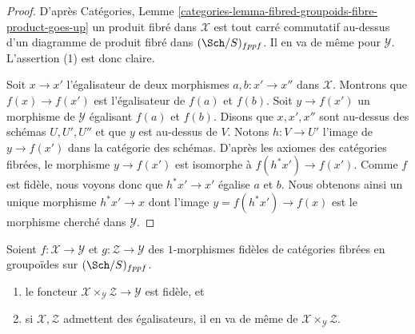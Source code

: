 \begin{proof}
D'après
Catégories, Lemme \ref{categories-lemma-fibred-groupoids-fibre-product-goes-up}
un produit fibré dans $\mathcal{X}$ est tout carré commutatif au-dessus
d'un diagramme de produit fibré dans $(\Sch/S)_{fppf}$. Il en va de même pour
$\mathcal{Y}$. L'assertion (1) est donc claire.

\medskip\noindent
Soit $x \to x'$ l'égalisateur de deux morphismes $a, b : x' \to x''$
dans $\mathcal{X}$. Montrons que $f(x) \to f(x')$ est l'égalisateur
de $f(a)$ et $f(b)$. Soit $y \to f(x')$ un morphisme de $\mathcal{Y}$
égalisant $f(a)$ et $f(b)$. Disons que $x, x', x''$ sont au-dessus des schémas
$U, U', U''$ et que $y$ est au-dessus de $V$. Notons $h : V \to U'$ l'image
de $y \to f(x')$ dans la catégorie des schémas. D'après les axiomes des catégories
fibrées, le morphisme $y \to f(x')$ est isomorphe à $f(h^*x') \to f(x')$.
Comme $f$ est fidèle, nous voyons donc que
$h^*x' \to x'$ égalise $a$ et $b$. Nous obtenons ainsi un unique morphisme
$h^*x' \to x$ dont l'image $y = f(h^*x') \to f(x)$ est le morphisme cherché
dans $\mathcal{Y}$.
\end{proof}

\begin{lemma}
\label{lemma-fibre-products-preserve-properties}
Soient $f : \mathcal{X} \to \mathcal{Y}$ et $g : \mathcal{Z} \to \mathcal{Y}$
des $1$-morphismes fidèles de catégories
fibrées en groupoïdes sur $(\Sch/S)_{fppf}$.
\begin{enumerate}
\item le foncteur $\mathcal{X} \times_\mathcal{Y} \mathcal{Z} \to \mathcal{Y}$
est fidèle, et
\item si $\mathcal{X}, \mathcal{Z}$ admettent des égalisateurs, il en va de même de
$\mathcal{X} \times_\mathcal{Y} \mathcal{Z}$.
\end{enumerate}
\end{lemma}

